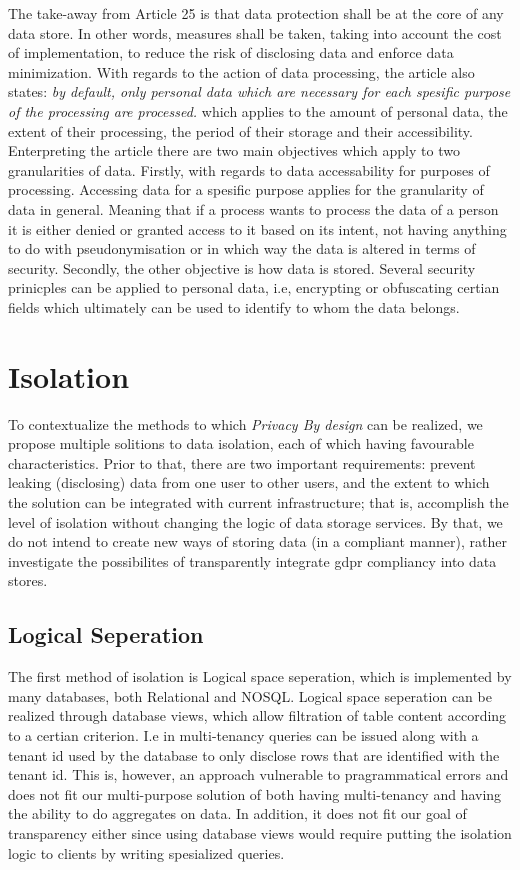 \documentclass[USenglish]{uit-thesis}
\begin{document}
The take-away from Article 25 is that data protection shall be at the core of any data store.
In other words, measures shall be taken, taking into account the cost of implementation, to
reduce the risk of disclosing data and enforce data minimization.
With regards to the action of data processing, the article also states:
\textit{by default, only personal data which are necessary for each spesific purpose of the processing are processed.} which
applies to the amount of personal data, the extent of their processing, the period of their storage and their accessibility.
Enterpreting the article there are two main objectives which apply to two granularities of data.
Firstly, with regards to data accessability for purposes of processing.
Accessing data for a spesific purpose applies for the granularity of data in general.
Meaning that if a process wants to process the data of a person it is either denied or granted access to it based on its intent,
not having anything to do with pseudonymisation or in which way the data is altered in terms of security.
Secondly, the other objective is how data is stored.
Several security prinicples can be applied to personal data, i.e, encrypting or obfuscating
certian fields which ultimately can be used to identify to whom the data belongs.



\section{Isolation}
To contextualize the methods to which \textit{Privacy By design} can be realized, we
propose multiple solitions to data isolation, each of which having favourable characteristics.
Prior to that, there are two important requirements: prevent leaking (disclosing) data
from one user to other users, and the extent to which the solution can be
integrated with current infrastructure; that is, accomplish the level of isolation
without changing the logic of data storage services.
By that, we do not intend to create new ways of storing data (in a compliant manner),
rather investigate the possibilites of transparently integrate \gls{gdpr} compliancy
into data stores.

\subsection{Logical Seperation}
The first method of isolation is Logical space seperation, which is implemented
by many databases, both Relational and NOSQL.
Logical space seperation can be realized through database views, which
allow filtration of table content according to a certian criterion.
I.e in multi-tenancy queries can be issued along with a tenant id used by the database
to only disclose rows that are identified with the tenant id.
This is, however, an approach vulnerable to pragrammatical errors and does not fit our
multi-purpose solution of both having multi-tenancy and having the ability to do aggregates
on data.
In addition, it does not fit our goal of transparency either since using
database views would require putting the isolation logic to clients by writing spesialized
queries.
\end{document}
